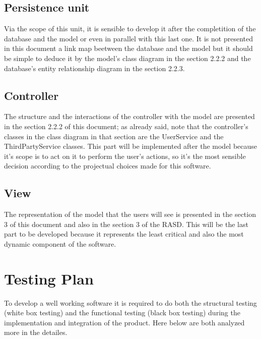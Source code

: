 \subsection{Persistence unit}
	Via the scope of this unit, it is sensible to develop it after the completition of the database and the model or even in parallel with this last one. It is not presented in this document a link map 	beetween the database and the model but it should be simple to deduce it by the model's class diagram in the section 2.2.2 and the database's entity relationship diagram in the section 			2.2.3.
\subsection{Controller}
	The structure and the interactions of the controller with the model are presented in the section 2.2.2  of this document; as already said, note that the controller's classes in the class 			diagram in that section are the UserService and the ThirdPartyService classes. This part will be implemented after the model because it's scope is to act on it to perform the user's actions, 		so it's the most sensible decision according to the projectual choices made for this software.
\subsection{View}
	The representation of the model that the users will see is presented in the section 3 of this document and also in the section 3 of the RASD. This will be the last part to be developed 			because it represents the least critical and also the most dynamic component of the software.

\section{Testing Plan}
To develop a well working software it is required to do both the structural testing (white box testing) and the functional testing (black box testing) during the implementation and integration of the product. Here below are both analyzed more in the detailes.\\
